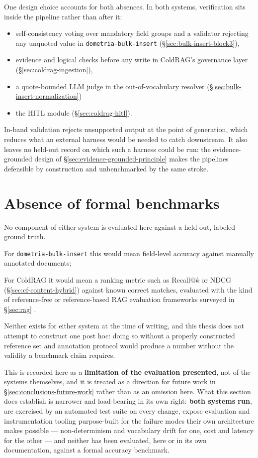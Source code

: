 One design choice accounts for both absences. In both systems, verification sits inside the pipeline rather than after it: 
\begin{itemize}
\item self-consistency voting over mandatory field groups and a validator rejecting any unquoted value in \texttt{dometria-bulk-insert} (\S\ref{sec:bulk-insert-block3}), 
\item evidence and logical checks before any write in ColdRAG's governance layer (\S\ref{sec:coldrag-ingestion}), 
\item a quote-bounded LLM judge in the out-of-vocabulary resolver (\S\ref{sec:bulk-insert-normalization})
\item the HITL module (\S\ref{sec:coldrag-hitl}). 
\end{itemize}
In-band validation rejects unsupported output at the point of generation, which reduces what an external harness would be needed to catch downstream. It also leaves no held-out record on which such a harness could be run: the evidence-grounded design of \S\ref{sec:evidence-grounded-principle} makes the pipelines defensible by construction and unbenchmarked by the same stroke.

\section{Absence of formal benchmarks}
\label{sec:results-limitations}

No component of either system is evaluated here against a held-out, labeled ground truth. 


For \texttt{dometria-bulk-insert} this would mean field-level accuracy against manually annotated documents;


For ColdRAG it would mean a ranking metric such as Recall@$k$ or NDCG (\S\ref{sec:cf-content-hybrid}) against known correct matches, evaluated with the kind of reference-free or reference-based RAG evaluation frameworks surveyed in \S\ref{sec:rag} \citep{es2024ragas,chen2024benchmarking}. 


Neither exists for either system at the time of writing, and this thesis does not attempt to construct one post hoc: doing so without a properly constructed reference set and annotation protocol would produce a number without the validity a benchmark claim requires.


This is recorded here as a \textbf{limitation of the evaluation presented}, not of the systems themselves, and it is treated as a direction for future work in \S\ref{sec:conclusions-future-work} rather than as an omission here. What this section does establish is narrower and load-bearing in its own right: \textbf{both systems run}, are exercised by an automated test suite on every change, expose evaluation and instrumentation tooling purpose-built for the failure modes their own architecture makes possible — non-determinism and vocabulary drift for one, cost and latency for the other — and neither has been evaluated, here or in its own documentation, against a formal accuracy benchmark.
